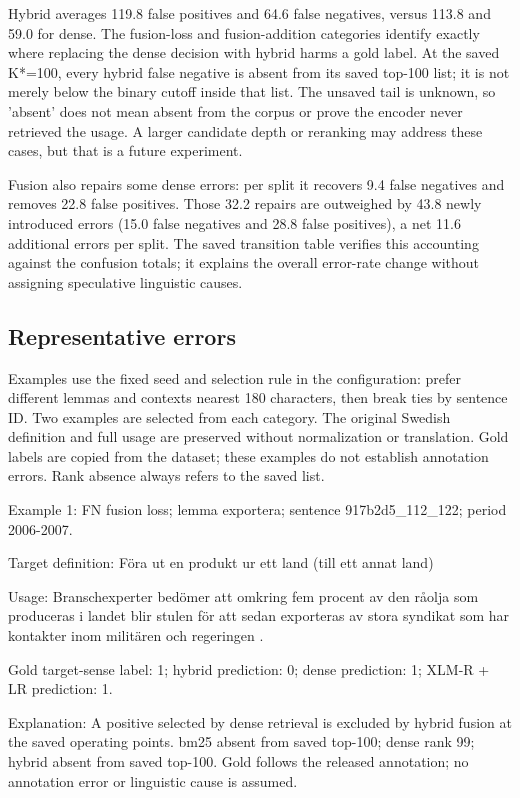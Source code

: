 Hybrid averages 119.8 false positives and 64.6 false negatives, versus 113.8 and 59.0 for dense. The fusion-loss and fusion-addition categories identify exactly where replacing the dense decision with hybrid harms a gold label. At the saved K*=100, every hybrid false negative is absent from its saved top-100 list; it is not merely below the binary cutoff inside that list. The unsaved tail is unknown, so 'absent' does not mean absent from the corpus or prove the encoder never retrieved the usage. A larger candidate depth or reranking may address these cases, but that is a future experiment.

Fusion also repairs some dense errors: per split it recovers 9.4 false negatives and removes 22.8 false positives. Those 32.2 repairs are outweighed by 43.8 newly introduced errors (15.0 false negatives and 28.8 false positives), a net 11.6 additional errors per split. The saved transition table verifies this accounting against the confusion totals; it explains the overall error-rate change without assigning speculative linguistic causes.

\subsection{Representative errors}
Examples use the fixed seed and selection rule in the configuration: prefer different lemmas and contexts nearest 180 characters, then break ties by sentence ID. Two examples are selected from each category. The original Swedish definition and full usage are preserved without normalization or translation. Gold labels are copied from the dataset; these examples do not establish annotation errors. Rank absence always refers to the saved list.

Example 1: FN fusion loss; lemma exportera; sentence 917b2d5\_112\_122; period 2006-2007.

Target definition: Föra ut en produkt ur ett land (till ett annat land)

Usage: Branschexperter bedömer att omkring fem procent av den råolja som produceras i landet blir stulen för att sedan exporteras av stora syndikat som har kontakter inom militären och regeringen .

Gold target-sense label: 1; hybrid prediction: 0; dense prediction: 1; XLM-R + LR prediction: 1.

Explanation: A positive selected by dense retrieval is excluded by hybrid fusion at the saved operating points. bm25 absent from saved top-100; dense rank 99; hybrid absent from saved top-100. Gold follows the released annotation; no annotation error or linguistic cause is assumed.

